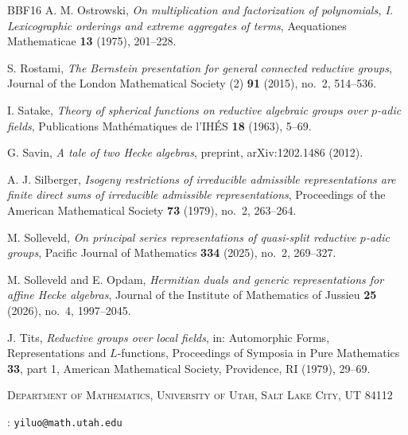 \documentclass[12pt]{article}
\numberwithin{equation}{section}
\theoremstyle{definition}
\theoremstyle{remark}
\theoremstyle{plain}
\begin{document}
\begin{thebibliography}{BBF16}
 A. M. Ostrowski, \textit{On multiplication and factorization of polynomials, I. Lexicographic orderings and extreme aggregates of terms}, Aequationes Mathematicae \textbf{13} (1975), 201--228.

 S. Rostami, \textit{The Bernstein presentation for general connected reductive groups}, Journal of the London Mathematical Society (2) \textbf{91} (2015), no.~2, 514--536.

 I. Satake, \textit{Theory of spherical functions on reductive algebraic groups over $p$-adic fields}, Publications Math\'ematiques de l'IH\'ES \textbf{18} (1963), 5--69.

 G. Savin, \textit{A tale of two Hecke algebras}, preprint, arXiv:1202.1486 (2012).

 A. J. Silberger, \textit{Isogeny restrictions of irreducible admissible representations are finite direct sums of irreducible admissible representations}, Proceedings of the American Mathematical Society \textbf{73} (1979), no.~2, 263--264.

 M. Solleveld, \textit{On principal series representations of quasi-split reductive $p$-adic groups}, Pacific Journal of Mathematics \textbf{334} (2025), no.~2, 269--327.

 M. Solleveld and E. Opdam, \textit{Hermitian duals and generic representations for affine Hecke algebras}, Journal of the Institute of Mathematics of Jussieu \textbf{25} (2026), no.~4, 1997--2045.

 J. Tits, \textit{Reductive groups over local fields}, in: Automorphic Forms, Representations and $L$-functions, Proceedings of Symposia in Pure Mathematics \textbf{33}, part 1, American Mathematical Society, Providence, RI (1979), 29--69.

\end{thebibliography}

\par
\nobreak
\begingroup
\footnotesize
{}
\par\addvspace{\bigskipamount}\indent
{\scshape Department of Mathematics, University of Utah, Salt Lake City, UT 84112}\par
\nobreak{}\/:\space
\texttt{yiluo@math.utah.edu}\par
\endgroup
\end{document}
